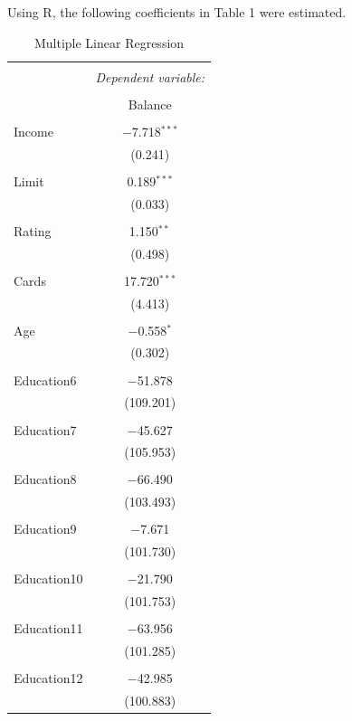 \documentclass[11pt]{article}
\begin{document}
{Using R, the following coefficients in Table 1 were estimated.
\begin{longtable}{@{\extracolsep{5pt}}lc} 
  \caption{Multiple Linear Regression} 
  \label{} 
\\[-1.8ex]\hline 
\hline \\[-1.8ex] 
 & \multicolumn{1}{c}{\textit{Dependent variable:}} \\ 
\cline{2-2} 
\\[-1.8ex] & Balance \\ 
\hline \\[-1.8ex] 
 Income & $-$7.718$^{***}$ \\ 
  & (0.241) \\ 
  & \\ 
 Limit & 0.189$^{***}$ \\ 
  & (0.033) \\ 
  & \\ 
 Rating & 1.150$^{**}$ \\ 
  & (0.498) \\ 
  & \\ 
 Cards & 17.720$^{***}$ \\ 
  & (4.413) \\ 
  & \\ 
 Age & $-$0.558$^{*}$ \\ 
  & (0.302) \\ 
  & \\ 
 Education6 & $-$51.878 \\ 
  & (109.201) \\ 
  & \\ 
 Education7 & $-$45.627 \\ 
  & (105.953) \\ 
  & \\ 
 Education8 & $-$66.490 \\ 
  & (103.493) \\ 
  & \\ 
 Education9 & $-$7.671 \\ 
  & (101.730) \\ 
  & \\ 
 Education10 & $-$21.790 \\ 
  & (101.753) \\ 
  & \\ 
 Education11 & $-$63.956 \\ 
  & (101.285) \\ 
  & \\ 
 Education12 & $-$42.985 \\ 
  & (100.883) \\ 

\end{longtable}}
\end{document}
